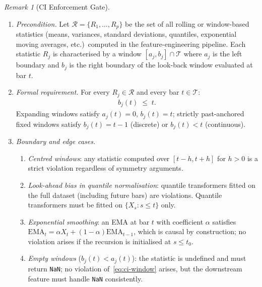 \documentclass[12pt,openany]{book}
\numberwithin{equation}{chapter}
\theoremstyle{plain}
\theoremstyle{definition}
\theoremstyle{remark}
\newtheorem{remark}[theorem]{Remark}
\numberwithin{equation}{chapter}
\theoremstyle{plain}
\begin{document}
\begin{remark}[CI Enforcement Gate]
\begin{enumerate}
  \begin{enumerate}

    \item \emph{Precondition.}
          Let $\mathcal{R} = \{R_{1}, \ldots, R_{p}\}$ be
          the set of all rolling or window-based statistics
          (means, variances, standard deviations, quantiles,
          exponential moving averages, etc.)\ computed in
          the feature-engineering pipeline.  Each statistic
          $R_{j}$ is characterised by a window
          $[a_{j}, b_{j}] \cap \mathcal{T}$ where $a_{j}$
          is the left boundary and $b_{j}$ is the right
          boundary of the look-back window evaluated at bar
          $t$.

    \item \emph{Formal requirement.}
          For every $R_{j} \in \mathcal{R}$ and every bar
          $t \in \mathcal{T}$:
          \begin{align}
            b_{j}(t) \;\leq\; t.
            \label{eq:ci-window}
          \end{align}
          Expanding windows satisfy $a_{j}(t) = 0$,
          $b_{j}(t) = t$; strictly past-anchored fixed
          windows satisfy $b_{j}(t) = t - 1$ (discrete) or
          $b_{j}(t) < t$ (continuous).

    \item \emph{Boundary and edge cases.}
    \begin{enumerate}
      \item \emph{Centred windows}: any statistic computed
            over $[t-h, t+h]$ for $h > 0$ is a strict
            violation regardless of symmetry arguments.
      \item \emph{Look-ahead bias in quantile normalisation}:
            quantile transformers fitted on the full dataset
            (including future bars) are violations.  Quantile
            transformers must be fitted on
            $\{X_{s} : s \leq t\}$ only.
      \item \emph{Exponential smoothing}: an EMA at bar $t$
            with coefficient $\alpha$ satisfies
            $\mathrm{EMA}_{t} = \alpha X_{t} + (1-\alpha)
            \mathrm{EMA}_{t-1}$, which is causal by
            construction; no violation arises if the
            recursion is initialised at $s \leq t_{0}$.
      \item \emph{Empty windows} ($b_{j}(t) < a_{j}(t)$):
            the statistic is undefined and must return
            \texttt{NaN}; no violation of~\eqref{eq:ci-window}
            arises, but the downstream feature must handle
            \texttt{NaN} consistently.
    \end{enumerate}


\end{enumerate}
\end{enumerate}
\end{remark}
\end{document}
